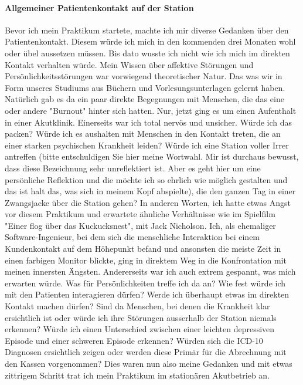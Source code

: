 \paragraph{Allgemeiner Patientenkontakt auf der Station}
Bevor ich mein Praktikum startete, machte ich mir diverse Gedanken über den Patientenkontakt. Diesem würde ich mich in den kommenden drei Monaten wohl oder übel aussetzen müssen. Bis dato wusste ich nicht wie ich mich im direkten Kontakt verhalten würde. Mein Wissen über affektive Störungen und Persönlichkeitsstörungen war vorwiegend theoretischer Natur. Das was wir in Form unseres Studiums aus Büchern und Vorlesungsunterlagen gelernt haben. Natürlich gab es da ein paar direkte Begegnungen mit Menschen, die das eine oder andere "Burnout" hinter sich hatten. Nur, jetzt ging es um einen Aufenthalt in einer Akutklinik. Einerseits war ich total nervös und unsicher. Würde ich das packen? Würde ich es aushalten mit Menschen in den Kontakt treten, die an einer starken psychischen Krankheit leiden? Würde ich eine Station voller Irrer antreffen (bitte entschuldigen Sie hier meine Wortwahl. Mir ist durchaus bewusst, dass diese Bezeichnung sehr unreflektiert ist. Aber es geht hier um eine persönliche Reflektion und die möchte ich so ehrlich wie möglich gestalten und das ist halt das, was sich in meinem Kopf abspielte), die den ganzen Tag in einer Zwangsjacke über die Station gehen? In anderen Worten, ich hatte etwas Angst vor diesem Praktikum und erwartete ähnliche Verhältnisse wie im Spielfilm "Einer flog über das Kuckucksnest", mit Jack Nicholson. Ich, als ehemaliger Software-Ingenieur, bei dem sich die menschliche Interaktion bei einem Kundenkontakt auf dem Höhepunkt befand und ansonsten die meiste Zeit in einen farbigen Monitor blickte, ging in direktem Weg in die Konfrontation mit meinen innersten Ängsten. Andererseits war ich auch extrem gespannt, was mich erwarten würde. Was für Persönlichkeiten treffe ich da an? Wie fest würde ich mit den Patienten interagieren dürfen? Werde ich überhaupt etwas im direkten Kontakt machen dürfen? Sind da Menschen, bei denen die Krankheit klar ersichtlich ist oder würde ich ihre Störungen ausserhalb der Station niemals erkennen? Würde ich einen Unterschied zwischen einer leichten depressiven Episode und einer schweren Episode erkennen? Würden sich die ICD-10 Diagnosen ersichtlich zeigen oder werden diese Primär für die Abrechnung mit den Kassen vorgenommen? Dies waren nun also meine Gedanken und mit etwas zittrigem Schritt trat ich mein Praktikum im stationären Akutbetrieb an.

